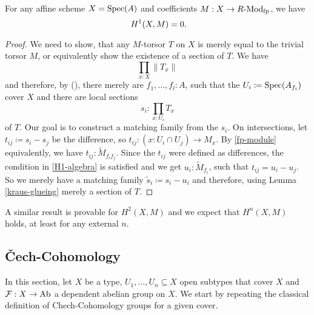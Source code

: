\begin{theorem}%
  \label{H1-fp-module-affine-trivial}
  For any affine scheme $X=\operatorname{Spec}(A)$ and coefficients $M: X\to R\text{-}\mathrm{Mod}_{\text{fp}}$, we have
  \[ H^1(X,M)=0 \rlap{.} \]
\end{theorem}
\begin{proof}
  We need to show, that any $M$-torsor $T$ on $X$ is merely equal to the trivial torsor $M$,
  or equivalently show the existence of a section of $T$.
  We have
  \[ \prod_{x:X}\| T_x \|\]
  and therefore, by (),
  there merely are $f_1,\dots,f_l:A$,
  such that the $U_i\coloneqq \operatorname{Spec}(A_{f_i})$ cover $X$ and
  there are local sections
  \[ s_i:\prod_{x:U_i}T_x\]
  of $T$. Our goal is to construct a matching family from the $s_i$.
  On intersections, let $t_{ij}\coloneqq s_i-s_j$ be the difference, so $t_{ij}:(x : U_i\cap U_j) \to M_x$.
  By \cref{fp-module} equivalently, we have $t_{ij}:\tilde{M}_{f_i f_j}$.
  Since the $t_{ij}$ were defined as differences,
  the condition in \cref{H1-algebra} is satisfied and we get
  $u_i:\tilde{M}_{f_i}$, such that $t_{ij}=u_i-u_j$.
  So we merely have a matching family $\tilde{s}_i\coloneqq s_i-u_i$ and therefore, using Lemma \ref{kraus-glueing} merely a section of $T$.
\end{proof}

A similar result is provable for $H^2(X,M)$ and we expect that $H^n(X,M)$ holds, at least for any external $n$.

\subsection{Čech-Cohomology}

In this section, let $X$ be a type, $U_1,\dots,U_n\subseteq X$ open subtypes that cover $X$
and $\mathcal F:X\to \operatorname{Ab}$ a dependent abelian group on $X$.
We start by repeating the classical definition of Chech-Cohomology groups for a given cover.

